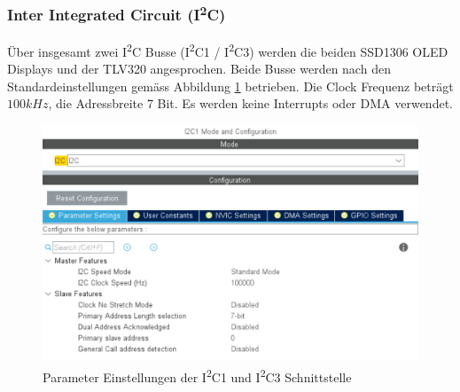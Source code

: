 \subsubsection{Inter Integrated Circuit (I\textsuperscript{2}C)}
\label{sec:CubeMXI2C}

Über insgesamt zwei I\textsuperscript{2}C Busse (I\textsuperscript{2}C1 / I\textsuperscript{2}C3) werden die beiden SSD1306 OLED Displays und der TLV320 angesprochen.
Beide Busse werden nach den Standardeinstellungen gemäss Abbildung \ref{pic:CubeMX_I2C1} betrieben.
Die Clock Frequenz beträgt $100\si{kHz}$, die Adressbreite 7 Bit.
Es werden keine Interrupts oder DMA verwendet.

\begin{figure}[H]
	\centering
	\includegraphics[width=0.9\linewidth]{../graphics/CubeMX_I2C1.png}
	\caption{Parameter Einstellungen der I\textsuperscript{2}C1 und  I\textsuperscript{2}C3 Schnittstelle}
	\label{pic:CubeMX_I2C1}
\end{figure}




\newpage